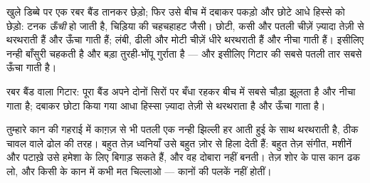 \begin{example}[ऊँची और नीची]\label{ex:g3:sound-around-us:pitch}
खुले डिब्बे पर एक रबर बैंड तानकर छेड़ो; फिर उसे बीच में दबाकर पकड़ो
और छोटे आधे हिस्से को छेड़ो: टनक \emph{ऊँची} हो जाती है, चिड़िया की
चहचहाहट जैसी। छोटी, कसी और पतली चीज़ें ज़्यादा तेज़ी से थरथराती हैं
और ऊँचा गाती हैं; लंबी, ढीली और मोटी चीज़ें धीरे थरथराती हैं और नीचा
गाती हैं। इसीलिए नन्ही बाँसुरी चहकती है और बड़ा तुरही-भोंपू गुर्राता
है --- और इसीलिए गिटार की सबसे पतली तार सबसे ऊँचा गाती है।
\end{example}

\begin{omfigure}

{\small रबर बैंड वाला गिटार: पूरा बैंड अपने दोनों सिरों पर बँधा रहकर
बीच में सबसे चौड़ा झूलता है और नीचा गाता है; दबाकर छोटा किया गया आधा
हिस्सा ज़्यादा तेज़ी से थरथराता है और ऊँचा गाता है।}
\end{omfigure}

\begin{remark}[कान के भीतर के नन्हे ढोल को बचाओ]\label{rem:g3:sound-around-us:ears}
तुम्हारे कान की गहराई में काग़ज़ से भी पतली एक नन्ही झिल्ली हर आती
हुई  के साथ थरथराती है, ठीक चावल वाले ढोल की तरह। बहुत तेज़
ध्वनियाँ उसे बहुत ज़ोर से हिला देती हैं: बहुत तेज़ संगीत, मशीनें और
पटाख़े उसे हमेशा के लिए बिगाड़ सकते हैं, और वह दोबारा नहीं बनती। तेज़
शोर के पास कान ढक लो, और किसी के कान में कभी मत चिल्लाओ --- कानों की
पलकें नहीं होतीं।
\end{remark}

